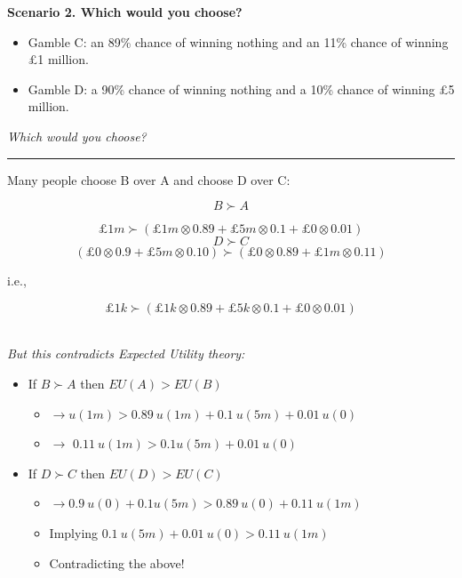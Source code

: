 \documentclass[]{article}
\providecommand{\tightlist}{%
  \setlength{\itemsep}{0pt}\setlength{\parskip}{0pt}}
\begin{document}
\bigskip

\textbf{Scenario 2. Which would you choose?}

\begin{itemize}
\tightlist
\item
  Gamble C: an 89\% chance of winning nothing and an 11\% chance of
  winning \pounds 1 million.
\item
  Gamble D: a 90\% chance of winning nothing and a 10\% chance of
  winning \pounds5 million.
\end{itemize}

\bigskip

\emph{Which would you choose?}

\begin{center}\rule{0.5\linewidth}{\linethickness}\end{center}

Many people choose B over A and choose D over C:

\[B \succ A \]

\[ \pounds 1m \succ  (\pounds 1m \otimes 0.89 + \pounds 5m \otimes 0.1 + \pounds0 \otimes 0.01)\]
\[D \succ C \]
\[(\pounds 0 \otimes 0.9 +  \pounds 5m \otimes 0.10) \succ (\pounds 0 \otimes 0.89 + \pounds 1m \otimes 0.11) \]

i.e.,

\[ \pounds 1k \succ  (\pounds 1k \otimes 0.89 + \pounds 5k \otimes 0.1 + \pounds0 \otimes 0.01)\]\\

\bigskip

\emph{But this contradicts Expected Utility theory:}

\begin{itemize}
\tightlist
\item
  If \(B \succ A\) then \(EU(A) > EU(B)\)

  \begin{itemize}
  \tightlist
  \item
    \(\rightarrow u(1m) > 0.89 \: u(1m) + 0.1 \: u(5m) + 0.01 \: u(0)\)
  \item
    \(\rightarrow\) \(0.11 \: u(1m) > 0.1 u(5m) + 0.01 \: u(0)\)
  \end{itemize}
\item
  If \(D \succ C\) then \(EU(D)>EU(C)\)

  \begin{itemize}
  \tightlist
  \item
    \(\rightarrow 0.9 \: u(0) + 0.1 u(5m) > 0.89 \: u(0) + 0.11 \: u(1m)\)
  \item
    Implying \(0.1 \: u(5m) + 0.01 \: u(0) > 0.11 \: u(1m)\)
  \item
    Contradicting the above!
  \end{itemize}
\end{itemize}
\end{document}

